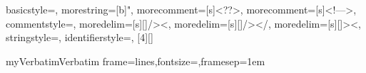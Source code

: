 {
  basicstyle=\ttfamily\footnotesize,
  morestring=[b]",
  morecomment=[s]{<?}{?>},
  morecomment=[s]{<!--}{-->},
  commentstyle=\color{codecolorcomment},
  moredelim=[s][\color{black}]{/>}{<},
  moredelim=[s][\color{black}]{/>}{</},
  moredelim=[s][\color{black}]{>}{<},
  stringstyle=\color{codecolorxmlstring},
  identifierstyle=\color{codecolorxmltag},
}
[4][]{%
  \noindent\minipage{\linewidth}\medskip
}{%
  \endminipage
}


\newenvironment{myListing}[3][]{%
  \begin{listing}[H]
  \myCaption{#1}{#3}\label{#2}%
  \hrule\medskip
}{%
  \medskip\hrule
  \end{listing}
}

\DefineVerbatimEnvironment%
{myVerbatim}{Verbatim}
{frame=lines,fontsize=\footnotesize,framesep=1em}

\newcommand{\binary}[1]{0x#1}



\newcommand{\class}[1]{{\color{codecolorclass}\texttt{#1}}}
\newcommand{\interface}[1]{{\color{codecolorclass}\texttt{#1}}}
\newcommand{\keyword}[1]{{\color{codecolorkeyword}\texttt{#1}}}
\newcommand{\namespace}[1]{{\color{codecolornamespace}\texttt{#1}}}
\newcommand{\method}[1]{{\color{codecolormethod}{\texttt{#1}}}}
\newcommand{\xmltag}[1]{{\color{codecolorxmltag}{\texttt{#1}}}}


\newcommand{\propgetset}{\{ \keyword{get}; \keyword{set}; \}}
\newcommand{\propget}{\{ \keyword{get}; \}}
\newcommand{\propset}{\{ \keyword{set}; \}}

\newcommand{\ditemsrcsize}{\footnotesize}


\newcommand{\ditemmethodseparator}{}

\def\makeditemmethodarg#1#2{\ditemmethodseparator{}\class{#2}%
\renewcommand{\ditemmethodseparator}{, }%
}

